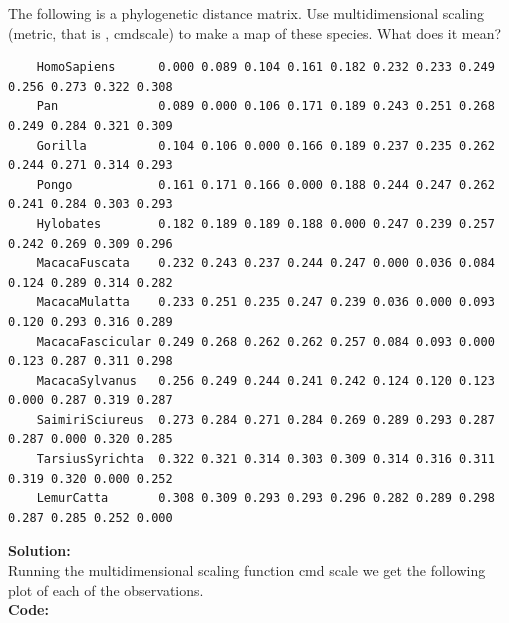 \documentclass[12pt]{article}
\makeatletter
\theoremstyle{homework}
\newenvironment{exercise}[1]
{\def\@currentlabel{#1}\exercisecore}
{\endexercisecore}
\newcommand{\localhead}[1]{\par\smallskip\noindent\textbf{#1}\nobreak\\}%
\newcommand\solution{\localhead{Solution:}}
\makeatother
\begin{document}
\begin{exercise}{2} The following is a phylogenetic distance matrix. Use multidimensional scaling (metric, that is , cmdscale) to make a map 
  of these species. What does it mean?
    \begin{footnotesize}
    \begin{verbatim}
    HomoSapiens      0.000 0.089 0.104 0.161 0.182 0.232 0.233 0.249 0.256 0.273 0.322 0.308
    Pan              0.089 0.000 0.106 0.171 0.189 0.243 0.251 0.268 0.249 0.284 0.321 0.309
    Gorilla          0.104 0.106 0.000 0.166 0.189 0.237 0.235 0.262 0.244 0.271 0.314 0.293
    Pongo            0.161 0.171 0.166 0.000 0.188 0.244 0.247 0.262 0.241 0.284 0.303 0.293
    Hylobates        0.182 0.189 0.189 0.188 0.000 0.247 0.239 0.257 0.242 0.269 0.309 0.296
    MacacaFuscata    0.232 0.243 0.237 0.244 0.247 0.000 0.036 0.084 0.124 0.289 0.314 0.282
    MacacaMulatta    0.233 0.251 0.235 0.247 0.239 0.036 0.000 0.093 0.120 0.293 0.316 0.289
    MacacaFascicular 0.249 0.268 0.262 0.262 0.257 0.084 0.093 0.000 0.123 0.287 0.311 0.298
    MacacaSylvanus   0.256 0.249 0.244 0.241 0.242 0.124 0.120 0.123 0.000 0.287 0.319 0.287
    SaimiriSciureus  0.273 0.284 0.271 0.284 0.269 0.289 0.293 0.287 0.287 0.000 0.320 0.285
    TarsiusSyrichta  0.322 0.321 0.314 0.303 0.309 0.314 0.316 0.311 0.319 0.320 0.000 0.252
    LemurCatta       0.308 0.309 0.293 0.293 0.296 0.282 0.289 0.298 0.287 0.285 0.252 0.000
      \end{verbatim}
    \end{footnotesize}
    \solution Running the multidimensional scaling function cmd scale we get the following plot of each of the observations. \\
    \textbf{Code:}
    \begin{center}
    
    \end{center} 


\end{exercise}
\end{document}
